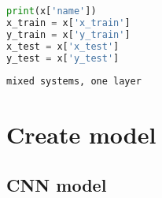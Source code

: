 \begin{lstlisting}[language=Python]
print(x['name'])
x_train = x['x_train']
y_train = x['y_train']
x_test = x['x_test']
y_test = x['y_test']
\end{lstlisting}

\begin{lstlisting}
mixed systems, one layer
\end{lstlisting}

\hypertarget{create-model}{%
\section*{Create model}\label{create-model}}

\hypertarget{cnn-model}{%
\subsection*{CNN model}\label{cnn-model}}

